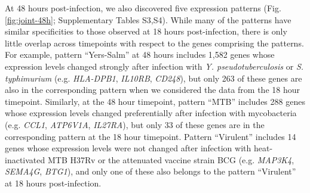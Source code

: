 At 48 hours post-infection, we also discovered five expression patterns
(Fig. \ref{fig:joint-48h}; Supplementary Tables S3,S4). While many of the patterns have
similar specificities to those observed at 18 hours post-infection,
there is only little overlap across timepoints with respect to the genes
comprising the patterns. For example, pattern ``Yers-Salm'' at 48 hours
includes 1,582 genes whose expression levels changed strongly after
infection with \emph{Y. pseudotuberculosis} or \emph{S. typhimurium}
(e.g. \emph{HLA-DPB1}, \emph{IL10RB}, \emph{CD248}), but only 263 of
these genes are also in the corresponding pattern when we considered the
data from the 18 hour timepoint. Similarly, at the 48 hour timepoint,
pattern ``MTB'' includes 288 genes whose expression levels changed
preferentially after infection with mycobacteria (e.g. \emph{CCL1},
\emph{ATP6V1A}, \emph{IL27RA}), but only 33 of these genes are in the
corresponding pattern at the 18 hour timepoint. Pattern ``Virulent''
includes 14 genes whose expression levels were not changed after
infection with heat-inactivated MTB H37Rv or the attenuated vaccine
strain BCG (e.g. \emph{MAP3K4}, \emph{SEMA4G}, \emph{BTG1}), and only
one of these also belongs to the pattern ``Virulent'' at 18 hours
post-infection.


